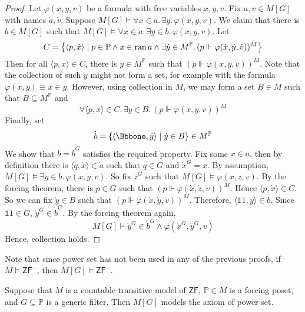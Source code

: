 \begin{proof}
    Let \( \varphi(x, y, v) \) be a formula with free variables \( x, y, v \).
    Fix \( a, v \in M[G] \) with names \( \dot a, \dot v \).
    Suppose \( M[G] \vDash \forall x \in a.\, \exists y.\, \varphi(x, y, v) \).
    We claim that there is \( b \in M[G] \) such that \( M[G] \vDash \forall x \in a.\, \exists y \in b.\, \varphi(x, y, v) \).
    Let
    \[ C = \qty{\langle p, \dot x \rangle \mid p \in \mathbb P \wedge x \in \operatorname{ran}a \wedge \exists \dot y \in M^{\mathbb P}.\, (p \Vdash \varphi(\dot x, \dot y, \dot v))^M} \]
    Then for all \( \langle p, \dot x \rangle \in C \), there is \( \dot y \in M^{\mathbb P} \) such that \( (p \Vdash \varphi(\dot x, \dot y, \dot v))^M \).
    Note that the collection of such \( \dot y \) might not form a set, for example with the formula \( \varphi(x, y) \equiv x \in y \).
    However, using collection in \( M \), we may form a set \( B \in M \) such that \( B \subseteq M^{\mathbb P} \) and
    \[ \forall \langle p, x \rangle \in C.\, \exists \dot y \in B.\, (p \Vdash \varphi(\dot x, \dot y, \dot v))^M \]
    Finally, set
    \[ \dot b = \qty{\langle \Bbbone, \dot y \rangle \mid \dot y \in B} \in M^{\mathbb P} \]
    We show that \( b = \dot b^G \) satisfies the required property.
    Fix some \( x \in a \), then by definition there is \( \langle q, \dot x \rangle \in \dot a \) such that \( q \in G \) and \( \dot x^G = x \).
    By assumption, \( M[G] \vDash \exists y \in b.\, \varphi(x, y, v) \).
    So fix \( \dot z^G \) such that \( M[G] \vDash \varphi(x, z, v) \).
    By the forcing theorem, there is \( p \in G \) such that \( (p \Vdash \varphi(\dot x, \dot z, \dot v))^M \).
    Hence \( \langle p, \dot x \rangle \in C \).
    So we can fix \( \dot y \in B \) such that \( (p \Vdash \varphi(\dot x, \dot y, \dot v))^M \).
    Therefore, \( \langle \Bbbone 1, \dot y \rangle \in \dot b \).
    Since \( \Bbbone 1 \in G \), \( \dot y^G \in \dot b^G \).
    By the forcing theorem again,
    \[ M[G] \vDash \dot y^G \in \dot b^G \wedge \varphi(\dot x^G, \dot y^G, v) \]
    Hence, collection holds.
\end{proof}
Note that since power set has not been used in any of the previous proofs, if \( M \vDash \mathsf{ZF}^- \), then \( M[G] \vDash \mathsf{ZF}^- \).
\begin{lemma}
    Suppose that \( M \) is a countable transitive model of \( \mathsf{ZF} \), \( \mathbb P \in M \) is a forcing poset, and \( G \subseteq \mathbb P \) is a generic filter.
    Then \( M[G] \) models the axiom of power set.
\end{lemma}
